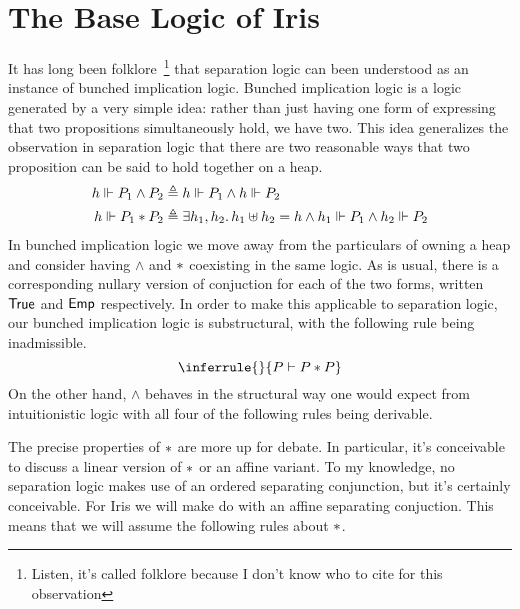 \documentclass{amsart}
\newcommand{\forces}{\Vdash}
\newcommand{\defs}{\triangleq}
\newcommand{\EMP}{\textlog{Emp}}
\begin{document}
\section{The Base Logic of Iris}\label{sec:logic}

It has long been folklore~\footnote{Listen, it's called folklore
  because I don't know who to cite for this observation} that
separation logic can been understood as an instance of bunched
implication logic. Bunched implication logic is a logic generated by a
very simple idea: rather than just having one form of expressing that
two propositions simultaneously hold, we have two. This idea
generalizes the observation in separation logic that there are two
reasonable ways that two proposition can be said to hold together on a
heap.
\begin{align*}
  h \forces P_1 \land P_2 &\defs h \forces P_1 \land h \forces P_2\\
  h \forces P_1 \sep P_2 &\defs \Exists h_1, h_2. h_1 \uplus h_2 = h
                           \land h_1 \forces P_1
                           \land h_2 \forces P_2
\end{align*}
In bunched implication logic we move away from the particulars of
owning a heap and consider having $\land$ and $\ast$ coexisting in the
same logic. As is usual, there is a corresponding nullary version of
conjuction for each of the two forms, written $\textsf{True}$ and $\EMP$
respectively. In order to make this applicable to separation logic, our
bunched implication logic is substructural, with the following rule
being inadmissible.
\[
  \inferrule{ }{P \vdash P \sep P}
\]
On the other hand, $\land$ behaves in the structural way one would
expect from intuitionistic logic with all four of the following rules
being derivable.
The precise properties of $\ast$ are more up for debate. In
particular, it's conceivable to discuss a linear version of $\ast$
or an affine variant. To my knowledge, no separation logic makes use
of an ordered separating conjunction, but it's certainly
conceivable. For Iris we will make do with an affine separating
conjuction. This means that we will assume the following rules about
$\ast$.
\end{document}
